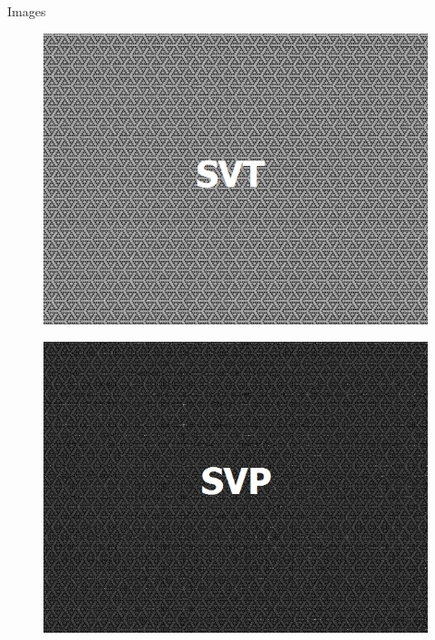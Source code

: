 \documentclass{beamer}
\begin{document}
\begin{frame}{Images}
\begin{multicols}{2}
	\end{multicols}
	\vspace{-0.4cm}
	\begin{multicols}{3}
		\vspace{-0.4cm}
		\begin{figure}[h]
			\centering
			\includegraphics[width=0.95\linewidth]{./../data/images/presentation/with_capture/p1_2.jpg}
		\end{figure}
		\vspace{-0.4cm}
		\begin{figure}[h]
			\centering
			\includegraphics[width=0.95\linewidth]{./../data/images/presentation/with_capture/p1_3.jpg}
		\end{figure}
		\vspace{-0.4cm}
		\begin{figure}[h]

\end{figure}
\end{multicols}
\end{frame}
\end{document}
